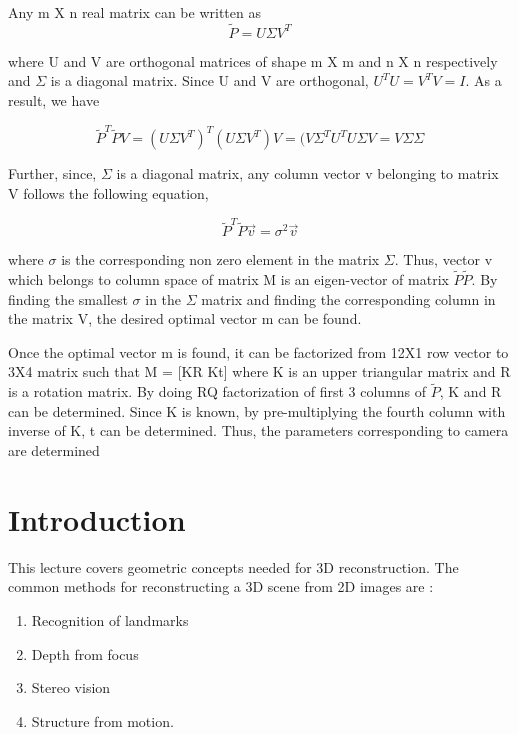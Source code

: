 \documentclass[twoside]{article}
\begin{document}
Any m X n real matrix can be written as 
\begin{equation} \label{eqno:9}
\tilde{P} = U \Sigma V^T \end{equation}

where U and V are orthogonal matrices of shape m X m and n X n respectively and $\Sigma $ is a diagonal matrix. Since U and V are orthogonal, $U^TU = V^TV = I$.  As a result, we have

\begin{equation} \label{eqno:10}
\tilde{P}^T \tilde{P} V = (U \Sigma V^T)^T (U \Sigma V^T) V = (V \Sigma^T U^T U \Sigma V = V \Sigma \Sigma  \end{equation}

Further, since,  $\Sigma$ is a diagonal matrix, any column vector v belonging to matrix V follows the following equation,

\begin{equation} \label{eqno:10}
\tilde{P}^T \tilde{P} \vec{v} = \sigma^2 \vec{v}  \end{equation}

where $\sigma$ is the corresponding non zero element in the matrix $\Sigma$. Thus, vector v which belongs to column space of matrix M is an eigen-vector of matrix $\tilde{P}\tilde{P}$. By finding the smallest $\sigma$ in the $\Sigma$ matrix and finding the corresponding column in the matrix V, the desired optimal vector m can be found.

Once the optimal vector m is found, it can be factorized from 12X1 row vector to 3X4 matrix such that M = [KR Kt] where K is an upper triangular matrix and R is a rotation matrix. By doing RQ factorization of first 3 columns of $\tilde{P}$, K and R can be determined. Since K is known, by pre-multiplying the fourth column with inverse of K, t can be determined. Thus, the parameters corresponding to camera are determined

\section{Introduction}

	This lecture \cite{slides} covers geometric concepts needed for 3D reconstruction.  The common methods for reconstructing a 3D scene from 2D images are :
\begin{enumerate}
\item Recognition of landmarks
\item Depth from focus
\item Stereo vision
\item Structure from motion.
\end{enumerate}
\end{document}
